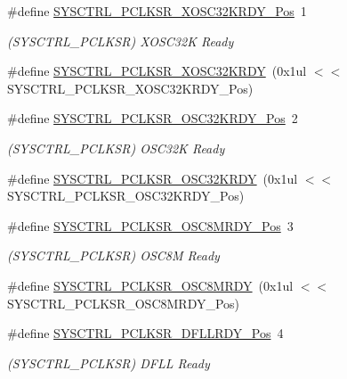 \begin{DoxyCompactItemize}
\item 
\#define \mbox{\hyperlink{group___s_a_m_d21___s_y_s_c_t_r_l_ga3568cf661b180b9137c18d653dbb113e}{S\+Y\+S\+C\+T\+R\+L\+\_\+\+P\+C\+L\+K\+S\+R\+\_\+\+X\+O\+S\+C32\+K\+R\+D\+Y\+\_\+\+Pos}}~1
\begin{DoxyCompactList}\small\item\em (S\+Y\+S\+C\+T\+R\+L\+\_\+\+P\+C\+L\+K\+SR) X\+O\+S\+C32K Ready \end{DoxyCompactList}\item 
\#define \mbox{\hyperlink{group___s_a_m_d21___s_y_s_c_t_r_l_ga14d59eef47e748f3670073a979630370}{S\+Y\+S\+C\+T\+R\+L\+\_\+\+P\+C\+L\+K\+S\+R\+\_\+\+X\+O\+S\+C32\+K\+R\+DY}}~(0x1ul $<$$<$ S\+Y\+S\+C\+T\+R\+L\+\_\+\+P\+C\+L\+K\+S\+R\+\_\+\+X\+O\+S\+C32\+K\+R\+D\+Y\+\_\+\+Pos)
\item 
\#define \mbox{\hyperlink{group___s_a_m_d21___s_y_s_c_t_r_l_gae6e25abb7329158234b94bc38c3fa4ad}{S\+Y\+S\+C\+T\+R\+L\+\_\+\+P\+C\+L\+K\+S\+R\+\_\+\+O\+S\+C32\+K\+R\+D\+Y\+\_\+\+Pos}}~2
\begin{DoxyCompactList}\small\item\em (S\+Y\+S\+C\+T\+R\+L\+\_\+\+P\+C\+L\+K\+SR) O\+S\+C32K Ready \end{DoxyCompactList}\item 
\#define \mbox{\hyperlink{group___s_a_m_d21___s_y_s_c_t_r_l_ga95a304b4031769de09fe38c56a52ceba}{S\+Y\+S\+C\+T\+R\+L\+\_\+\+P\+C\+L\+K\+S\+R\+\_\+\+O\+S\+C32\+K\+R\+DY}}~(0x1ul $<$$<$ S\+Y\+S\+C\+T\+R\+L\+\_\+\+P\+C\+L\+K\+S\+R\+\_\+\+O\+S\+C32\+K\+R\+D\+Y\+\_\+\+Pos)
\item 
\#define \mbox{\hyperlink{group___s_a_m_d21___s_y_s_c_t_r_l_gabc52541630162a27ef90d500a050cc09}{S\+Y\+S\+C\+T\+R\+L\+\_\+\+P\+C\+L\+K\+S\+R\+\_\+\+O\+S\+C8\+M\+R\+D\+Y\+\_\+\+Pos}}~3
\begin{DoxyCompactList}\small\item\em (S\+Y\+S\+C\+T\+R\+L\+\_\+\+P\+C\+L\+K\+SR) O\+S\+C8M Ready \end{DoxyCompactList}\item 
\#define \mbox{\hyperlink{group___s_a_m_d21___s_y_s_c_t_r_l_ga063723c39bfd90de5f674a4cace292ef}{S\+Y\+S\+C\+T\+R\+L\+\_\+\+P\+C\+L\+K\+S\+R\+\_\+\+O\+S\+C8\+M\+R\+DY}}~(0x1ul $<$$<$ S\+Y\+S\+C\+T\+R\+L\+\_\+\+P\+C\+L\+K\+S\+R\+\_\+\+O\+S\+C8\+M\+R\+D\+Y\+\_\+\+Pos)
\item 
\#define \mbox{\hyperlink{group___s_a_m_d21___s_y_s_c_t_r_l_gabc281422fc3efcc561f905c712d85def}{S\+Y\+S\+C\+T\+R\+L\+\_\+\+P\+C\+L\+K\+S\+R\+\_\+\+D\+F\+L\+L\+R\+D\+Y\+\_\+\+Pos}}~4
\begin{DoxyCompactList}\small\item\em (S\+Y\+S\+C\+T\+R\+L\+\_\+\+P\+C\+L\+K\+SR) D\+F\+LL Ready \end{DoxyCompactList}\item 
$$
\end{DoxyCompactItemize}
